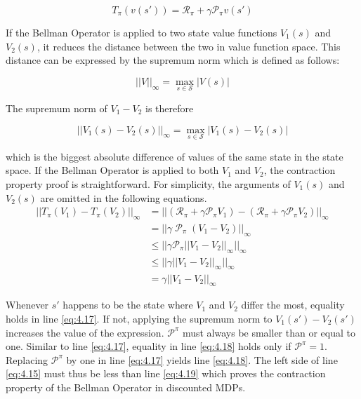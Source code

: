 \begin{equation}
T_\pi(v(s'))=\mathcal{R}_\pi+\gamma \mathcal{P}_\pi v(s')
\label{eq:bellman_operator_discounted}
\end{equation}

If the Bellman Operator is applied to two state value functions $V_1(s)$ and $V_2(s)$, it reduces the distance between the two in value function space. This distance can be expressed by the supremum norm which is defined as follows:

\begin{equation}
||V||_\infty = \max_{s \in \mathcal{S}} |V(s)|
\end{equation}

The supremum norm of $V_1 - V_2$ is therefore

\begin{equation}
||V_1(s) - V_2(s)||_\infty = \max_{s \in \mathcal{S}} |V_1(s)-V_2(s)|
\end{equation}

which is the biggest absolute difference of values of the same state in the state space. If the Bellman Operator is applied to both $V_1$ and $V_2$, the contraction property proof is straightforward. For simplicity, the arguments of $V_1(s)$ and $V_2(s)$ are omitted in the following equations.
\begin{align}
||T_\pi(V_1)-T_\pi(V_2)||_\infty &= ||(\mathcal{R}_\pi+\gamma \mathcal{P}_\pi V_1)-(\mathcal{R}_\pi+\gamma \mathcal{P}_\pi V_2)||_\infty \label{eq:4.15}\\
&=||\gamma\; \mathcal{P}_\pi\;(V_1 - V_2)||_\infty \label{eq:4.16}\\
&\leq ||\gamma \mathcal{P}_\pi ||V_1 - V_2||_\infty ||_\infty \label{eq:4.17} \\
&\leq ||\gamma ||V_1 - V_2||_\infty ||_\infty \label{eq:4.18}\\
&=\gamma ||V_1 - V_2||_\infty \label{eq:4.19}
\end{align} 

Whenever $s'$ happens to be the state where $V_1$ and $V_2$ differ the most, equality holds in line \ref{eq:4.17}. If not, applying the supremum norm to $V_1(s')-V_2(s')$ increases the value of the expression. $\mathcal{P}^\pi$ must always be smaller than or equal to one. Similar to line \ref{eq:4.17}, equality in line \ref{eq:4.18} holds only if $\mathcal{P}^\pi=1$. Replacing $\mathcal{P}^\pi$ by one in line \ref{eq:4.17} yields line \ref{eq:4.18}. The left side of line \ref{eq:4.15} must thus be less than line \ref{eq:4.19} which proves the contraction property of the Bellman Operator in discounted MDPs.

